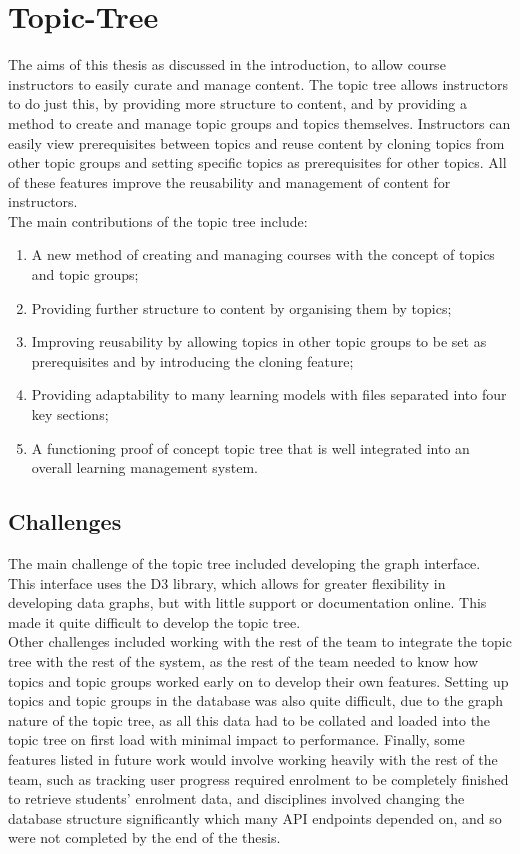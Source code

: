 \section{Topic-Tree}
The aims of this thesis as discussed in the introduction, to allow course instructors to easily curate and manage content. The topic tree allows instructors to do just this, by providing more structure to content, and by providing a method to create and manage topic groups and topics themselves. Instructors can easily view prerequisites between topics and reuse content by cloning topics from other topic groups and setting specific topics as prerequisites for other topics. All of these features improve the reusability and management of content for instructors.\\

The main contributions of the topic tree include:
\begin{enumerate}
    \item A new method of creating and managing courses with the concept of topics and topic groups;
	\item Providing further structure to content by organising them by topics;
	\item Improving reusability by allowing topics in other topic groups to be set as prerequisites and by introducing the cloning feature;
    \item Providing adaptability to many learning models with files separated into four key sections;
    \item A functioning proof of concept topic tree that is well integrated into an overall learning management system.
\end{enumerate}

\subsection{Challenges}
The main challenge of the topic tree included developing the graph interface. This interface uses the D3 library, which allows for greater flexibility in developing data graphs, but with little support or documentation online. This made it quite difficult to develop the topic tree.\\

Other challenges included working with the rest of the team to integrate the topic tree with the rest of the system, as the rest of the team needed to know how topics and topic groups worked early on to develop their own features. Setting up topics and topic groups in the database was also quite difficult, due to the graph nature of the topic tree, as all this data had to be collated and loaded into the topic tree on first load with minimal impact to performance. Finally, some features listed in future work would involve working heavily with the rest of the team, such as tracking user progress required enrolment to be completely finished to retrieve students' enrolment data, and disciplines involved changing the database structure significantly which many API endpoints depended on, and so were not completed by the end of the thesis. \\

